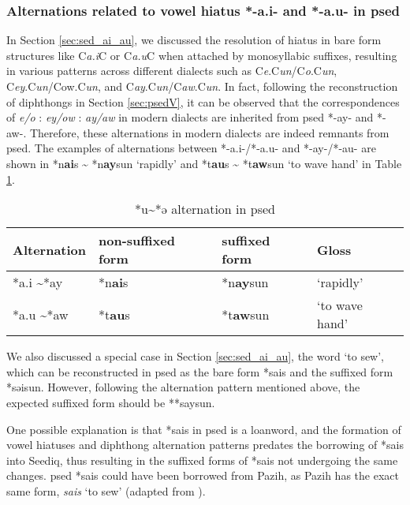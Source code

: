 \subsubsection{Alternations related to vowel hiatus *-a.i- and *-a.u- in \acl{psed}}

In Section \ref{sec:sed_ai_au}, we discussed the resolution of hiatus in bare form structures like C\textit{a.i}C or C\textit{a.u}C when attached by monosyllabic suffixes, resulting in various patterns across different dialects such as C\textit{e}.C\textit{un}/C\textit{o}.C\textit{un}, C\textit{ey}.C\textit{un}/Cow.C\textit{un}, and C\textit{ay}.C\textit{un}/C\textit{aw}.C\textit{un}. In fact, following the reconstruction of diphthongs in Section \ref{sec:psedV}, it can be observed that the correspondences of \textit{e/o} : \textit{ey/ow} : \textit{ay/aw} in modern dialects are inherited from \acl{psed} *-ay- and *-aw-. Therefore, these alternations in modern dialects are indeed remnants from \acl{psed}. The examples of alternations between *-a.i-/*-a.u- and *-ay-/*-au- are shown in *n\textbf{ai}s \~{} *n\textbf{ay}sun `rapidly' and *t\textbf{au}s \~{} *t\textbf{aw}sun `to wave hand' in Table \ref{tab:psed_ai_au}.

\begin{table}[!htbp]
\centering
\caption{*u\~{}*ə alternation in \acl{psed}}
\label{tab:psed_ai_au}
\begin{tabular}{llll}
\hline
Alternation        & non-suffixed form    & suffixed form & Gloss     \\ \hline
*a.i \~{ }*ay      & *n\textbf{ai}s & *n\textbf{ay}sun     & `rapidly' \\
*a.u \~{ }*aw      & *t\textbf{au}s & *t\textbf{aw}sun     & `to wave hand'   \\ \hline
\end{tabular}
\end{table}

We also discussed a special case in Section \ref{sec:sed_ai_au}, the word `to sew', which can be reconstructed in \acl{psed} as the bare form *sais and the suffixed form *səisun. However, following the alternation pattern mentioned above, the expected suffixed form should be **saysun.

One possible explanation is that *sais in \acl{psed} is a loanword, and the formation of vowel hiatuses and diphthong alternation patterns predates the borrowing of *sais into Seediq, thus resulting in the suffixed forms of *sais not undergoing the same changes. \acl{psed} *sais could have been borrowed from Pazih, as Pazih has the exact same form, \textit{sais} `to sew' (adapted from \cite{liandtsuchida2001paz}).

